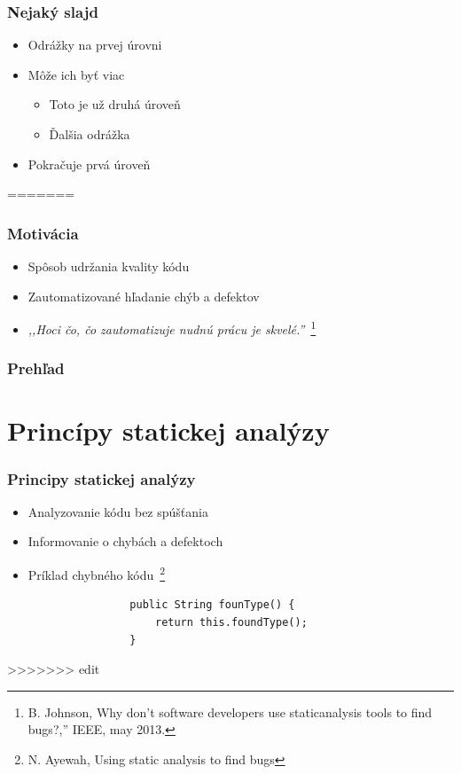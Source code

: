 \documentclass{beamer}
\newcommand{\footcite}[1]{\footnote{\tiny #1}}
\newcommand{\footcite}[1]{\footnote{\tiny #1}}
\begin{document}
\begin{frame}[fragile=singleslide]\frametitle{Nejaký slajd}
\begin{itemize}
\item Odrážky na prvej úrovni
\item Môže ich byť viac
	\begin{itemize}
	\item Toto je už druhá úroveň
	\item Ďalšia odrážka
	\end{itemize}
\item Pokračuje prvá úroveň
\end{itemize}
=======
\begin{frame}[fragile=singleslide]
	\titlepage
\end{frame}

\begin{frame}[fragile=singleslide]\frametitle{Motivácia}
	\begin{itemize}
		\item Spôsob udržania kvality kódu
		\item Zautomatizované hľadanie chýb a defektov
		\item \emph{,,Hoci čo, čo zautomatizuje nudnú prácu je skvelé.''}~\footcite{B. Johnson, Why don't software developers use
			      staticanalysis tools to find bugs?,” IEEE, may 2013. }
	\end{itemize}
\end{frame}

\begin{frame}[fragile=singleslide]\frametitle{Prehľad}
	\tableofcontents
\end{frame}


\section{Princípy statickej analýzy}

\begin{frame}[fragile=singleslide]\frametitle{Principy statickej analýzy}
	\begin{itemize}
		\item Analyzovanie kódu bez spúšťania
		\item Informovanie o chybách a defektoch
		\item Príklad chybného kódu~\footcite{N. Ayewah, Using static analysis to find bugs}
		      \begin{lstlisting}
				public String founType() {
					return this.foundType();
				}
				\end{lstlisting}
	\end{itemize}
>>>>>>> edit
\end{frame}




\end{frame}
\end{document}
